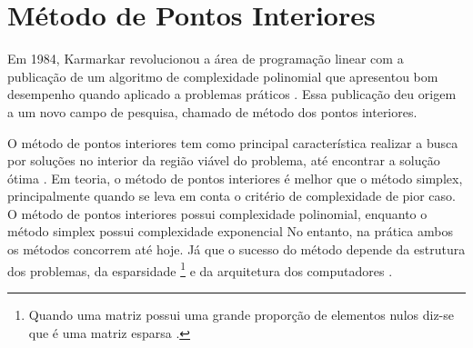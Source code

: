 \noindent
{}
\section{Método de Pontos Interiores}
Em 1984, Karmarkar revolucionou a área de programação linear com a publicação de um algoritmo de complexidade polinomial que apresentou bom desempenho quando aplicado a problemas práticos \cite{MaculanPI}. Essa publicação deu origem a um novo campo de pesquisa, chamado de método dos pontos interiores. 

O método de pontos interiores tem como principal característica realizar a busca por soluções no interior da região viável do problema, até encontrar a solução ótima \cite{Pinto}.
Em teoria, o método de pontos interiores é melhor que o método simplex, principalmente quando se leva em conta o critério de complexidade de pior caso. O método de pontos interiores possui complexidade polinomial, enquanto o método simplex possui complexidade exponencial No entanto, na prática ambos os métodos concorrem até hoje. Já que o sucesso do método depende da estrutura dos problemas, da esparsidade \footnote{Quando uma matriz possui uma grande proporção de elementos nulos diz-se que é uma matriz esparsa \cite{Munari}.} e da arquitetura dos computadores \cite{MaculanPI}.

